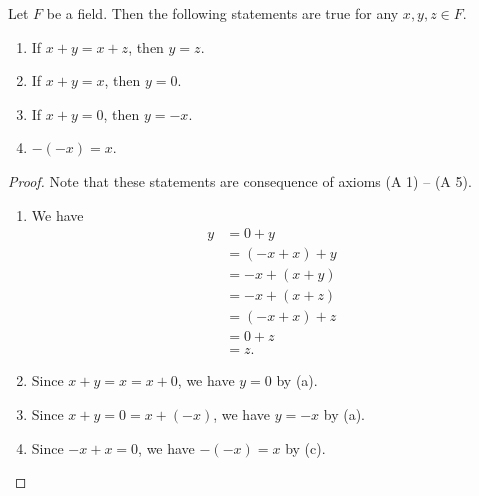 \begin{theorem}
  Let $F$ be a field.
  Then the following statements are true for any $x, y, z \in F$.
  \begin{enumerate}
    \item If $x + y = x + z$, then $y = z$.
    \item If $x + y = x$, then $y = 0$.
    \item If $x + y = 0$, then $y = -x$.
    \item $-(-x) = x$.
  \end{enumerate}
\end{theorem}
\begin{proof}
  Note that these statements are consequence of axioms (A 1) -- (A 5).
  \begin{enumerate}
    \item We have
    \begin{align*}
      y
      &= 0 + y \\
      &= (-x + x) + y \\
      &= -x + (x + y) \\
      &= -x + (x + z) \\
      &= (-x + x) + z \\
      &= 0 + z \\
      &= z.
    \end{align*}
    \item Since $x + y = x = x + 0$, we have $y = 0$ by (a).
    \item Since $x + y = 0 = x + (-x)$, we have $y = -x$ by (a).
    \item Since $-x + x = 0$, we have $-(-x) = x$ by (c). \qedhere
  \end{enumerate}
\end{proof}

